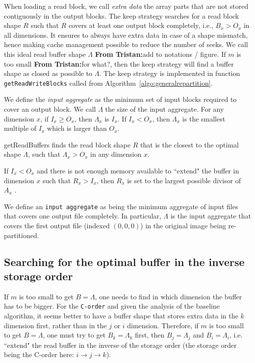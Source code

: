 \documentclass[sigconf, nonacm]{acmart}
\newcommand{\tristan}[1]{\color{orange}\textbf{From Tristan:}#1\color{black}}
\begin{document}
{%




When loading a read block, we call \emph{extra data} the array parts that
are not stored contiguously in the output blocks. The keep strategy
searches for a read block shape $R$ such that $R$ covers at least one
output block completely, i.e., $B_x>O_x$ in all dimensions. It ensures to
always have extra data in case of a shape mismatch, hence making cache
management possible to reduce the number of seeks. We call this ideal read
buffer shape $\Lambda$ \tristan{add to notations / figure}. If $m$ is too
small \tristan{for what?}, then the keep strategy will find a buffer shape
as closed as possible to $\Lambda$. The keep strategy is implemented in
function \texttt{getReadWriteBlocks} called from
Algorithm~\ref{algo:generalrepartition}.

We define the \emph{input aggregate} as the minimum set of input blocks required to 
cover an output block. We call $\Lambda$ the size of the input aggregate. 
For any dimension $x$, if $I_x \geq O_x$, then $\Lambda_x$ is $I_x$. If $I_x < O_x$, then
$\Lambda_x$ is the smallest multiple of $I_x$ which is larger than $O_x$. 


getReadBuffers finds the read block shape $R$ that is the closest to the optimal
shape $\Lambda$, such that $\Lambda_x>O_x$ in any dimension $x$.




If $I_x < O_x$ and there is not enough memory available to ``extend"
the buffer in dimension $x$ such that $R_x > I_x$, then $R_x$ is set to the
largest possible divisor of $A_x$ .

We define an \texttt{input aggregate} as being the minimum aggregate of input
files that covers one output file completely. In particular, $\Lambda$ is the
input aggregate that covers the first output file (indexed $(0,0,0)$) in the
original image being re-partitioned.

\subsection{Searching for the optimal buffer in the inverse storage order}
If $m$ is too small to get $B=\Lambda$, one needs to find in which dimension
the buffer has to be bigger.
For the \texttt{C-order} and given the analysis of the baseline algorithm,
it seems better to have a buffer shape that stores extra data in the $k$
dimension first, rather than in the $j$ or $i$ dimension.
Therefore, if $m$ is too small to get $B=\Lambda$, one must try to get
$B_k=\Lambda_k$ first, then $B_j=\Lambda_j$ and $B_i=\Lambda_i$, i.e. ``extend"
the read buffer in the inverse of the storage order (the storage order being the
C-order here: $i\rightarrow j\rightarrow k$).

}
\end{document}
